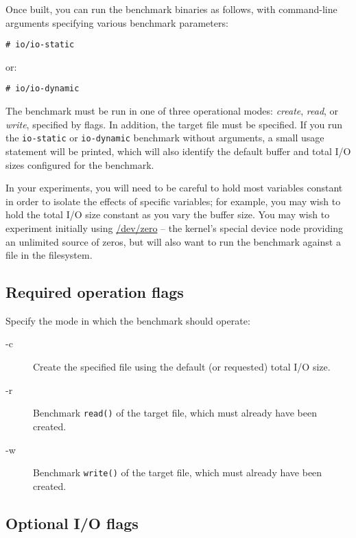 \documentclass[a4paper,10pt]{article}
\begin{document}
Once built, you can run the benchmark binaries as follows, with command-line
arguments specifying various benchmark parameters:

\begin{verbatim}
# io/io-static
\end{verbatim}

\noindent
or:

\begin{verbatim}
# io/io-dynamic
\end{verbatim}

The benchmark must be run in one of three operational modes: \textit{create},
\textit{read}, or \textit{write}, specified by flags.
In addition, the target file must be specified.
If you run the \texttt{io-static} or \texttt{io-dynamic} benchmark without
arguments, a small usage statement will be printed, which will also identify
the default buffer and total I/O sizes configured for the benchmark.

In your experiments, you will need to be careful to hold most variables
constant in order to isolate the effects of specific variables; for example,
you may wish to hold the total I/O size constant as you vary the buffer size.
You may wish to experiment initially using \url{/dev/zero} -- the kernel's
special device node providing an unlimited source of zeros, but will also want
to run the benchmark against a file in the filesystem.

\subsection*{Required operation flags}

Specify the mode in which the benchmark should operate:

\begin{description}
\item[-c] Create the specified file using the default (or requested) total
  I/O size.

\item[-r] Benchmark \texttt{read()} of the target file, which must already
  have been created.

\item[-w] Benchmark \texttt{write()} of the target file, which must already
  have been created.
\end{description}

\subsection*{Optional I/O flags}
\end{document}
